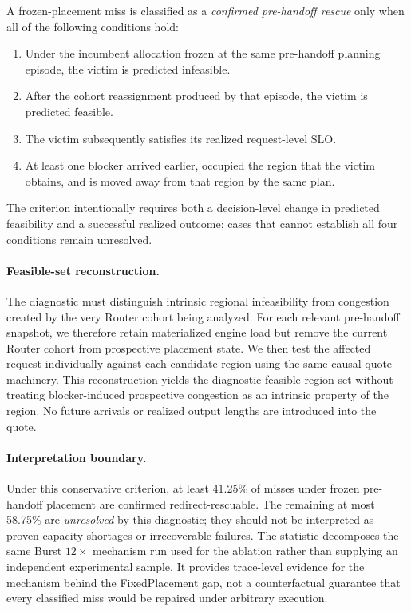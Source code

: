 \documentclass[letterpaper,twocolumn,10pt]{article}
\begin{document}
A frozen-placement miss is classified as a \emph{confirmed pre-handoff rescue}
only when all of the following conditions hold:
\begin{enumerate}
    \item Under the incumbent allocation frozen at the same pre-handoff planning
          episode, the victim is predicted infeasible.
    \item After the cohort reassignment produced by that episode, the victim is
          predicted feasible.
    \item The victim subsequently satisfies its realized request-level SLO.
    \item At least one blocker arrived earlier, occupied the region that the
          victim obtains, and is moved away from that region by the same plan.
\end{enumerate}
The criterion intentionally requires both a decision-level change in predicted
feasibility and a successful realized outcome; cases that cannot establish all
four conditions remain unresolved.

\paragraph{Feasible-set reconstruction.}
The diagnostic must distinguish intrinsic regional infeasibility from
congestion created by the very Router cohort being analyzed.
For each relevant pre-handoff snapshot, we therefore retain materialized engine
load but remove the current Router cohort from prospective placement state.
We then test the affected request individually against each candidate region
using the same causal quote machinery.
This reconstruction yields the diagnostic feasible-region set without treating
blocker-induced prospective congestion as an intrinsic property of the region.
No future arrivals or realized output lengths are introduced into the quote.

\paragraph{Interpretation boundary.}
Under this conservative criterion, at least 41.25\% of misses under frozen
pre-handoff placement are confirmed redirect-rescuable.
The remaining at most 58.75\% are \emph{unresolved} by this diagnostic; they
should not be interpreted as proven capacity shortages or irrecoverable
failures.
The statistic decomposes the same Burst $12\times$ mechanism run used for the
ablation rather than supplying an independent experimental sample.
It provides trace-level evidence for the mechanism behind the
FixedPlacement gap, not a counterfactual guarantee that every classified miss
would be repaired under arbitrary execution.
\end{document}
